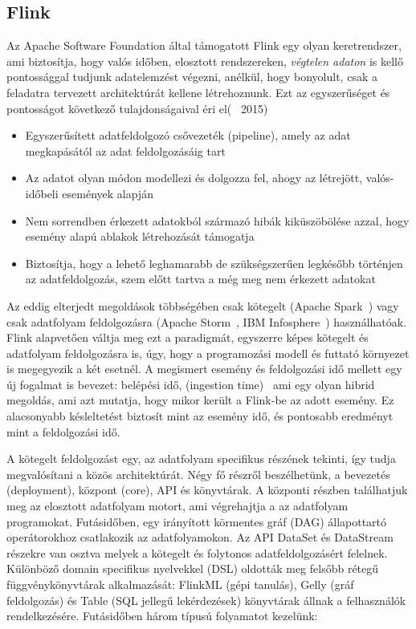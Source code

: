 \documentclass[a4paper,12pt]{article}
\begin{document}
\subsection{Flink}
Az Apache Software Foundation által támogatott Flink egy olyan keretrendszer, ami biztosítja, hogy valós időben, elosztott rendszereken, \textsl{végtelen adaton} is kellő pontossággal tudjunk adatelemzést végezni, anélkül, hogy bonyolult, csak a feladatra tervezett architektúrát kellene létrehoznunk. Ezt az egyszerűséget és pontosságot következő tulajdonságaival éri el(~\citeauthor{flinkartisans} 2015)
\begin{itemize}
\item Egyszerűsített adatfeldolgozó csővezeték (pipeline), amely az adat megkapásától az adat feldolgozásáig tart
\item Az adatot olyan módon modellezi és dolgozza fel, ahogy az létrejött, valós-időbeli események alapján
\item Nem sorrendben érkezett adatokból származó hibák kiküszöbölése azzal, hogy esemény alapú ablakok létrehozását támogatja
\item Biztosítja, hogy a lehető leghamarabb de szükségszerűen legkésőbb történjen az adatfeldolgozás, szem előtt tartva a még meg nem érkezett adatokat
\end{itemize}

Az eddig elterjedt megoldások többségében csak kötegelt (Apache Spark~\cite{spark}) vagy csak adatfolyam feldolgozásra (Apache Storm~\cite{storm}, IBM Infosphere~\cite{infosphere}) használhatóak. Flink alapvetően váltja meg ezt a paradigmát, egyszerre képes kötegelt és adatfolyam feldolgozásra is, úgy, hogy a programozási modell és futtató környezet is megegyezik a két esetnél. A megismert esemény és feldolgozási idő mellett egy új fogalmat is bevezet: belépési idő, (ingestion time)~\cite{ingestion} ami egy olyan hibrid megoldás, ami azt mutatja, hogy mikor került a Flink-be az adott esemény.
Ez alacsonyabb késleltetést biztosít mint az esemény idő, és pontosabb eredményt mint a feldolgozási idő. \newline

A kötegelt feldolgozást egy, az adatfolyam specifikus részének tekinti, így tudja megvalósítani a közös architektúrát. Négy fő részről beszélhetünk, a bevezetés (deployment), központ (core), API és könyvtárak. A központi részben találhatjuk meg az elosztott adatfolyam motort, ami végrehajtja a az adatfolyam programokat. Futásidőben, egy irányított körmentes gráf (DAG) állapottartó operátorokhoz csatlakozik az adatfolyamokon. Az API DataSet és DataStream részekre van osztva melyek a kötegelt és folytonos adatfeldolgozásért felelnek. Különböző domain specifikus nyelvekkel (DSL) oldották meg felsőbb rétegű függvénykönyvtárak alkalmazását: FlinkML (gépi tanulás), Gelly (gráf feldolgozás) és Table (SQL jellegű lekérdezések) könyvtárak állnak a felhasználók rendelkezésére.  Futásidőben három típusú folyamatot kezelünk:
 
\end{document}

